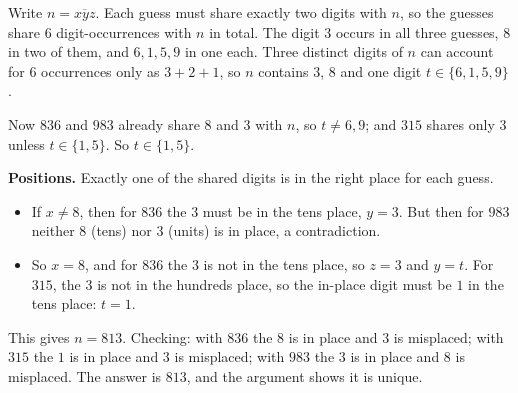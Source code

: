 Write $n=\overline{xyz}$. Each guess must share exactly two digits with $n$, so the guesses share $6$ digit-occurrences with $n$ in total. The digit $3$ occurs in all three guesses, $8$ in two of them, and $6,1,5,9$ in one each. Three distinct digits of $n$ can account for $6$ occurrences only as $3+2+1$, so $n$ contains $3$, $8$ and one digit $t\in\{6,1,5,9\}$.

Now $836$ and $983$ already share $8$ and $3$ with $n$, so $t\ne6,9$; and $315$ shares only $3$ unless $t\in\{1,5\}$. So $t\in\{1,5\}$.

\textbf{Positions.} Exactly one of the shared digits is in the right place for each guess.
\begin{itemize}
\item If $x\ne8$, then for $836$ the $3$ must be in the tens place, $y=3$. But then for $983$ neither $8$ (tens) nor $3$ (units) is in place, a contradiction.
\item So $x=8$, and for $836$ the $3$ is not in the tens place, so $z=3$ and $y=t$. For $315$, the $3$ is not in the hundreds place, so the in-place digit must be $1$ in the tens place: $t=1$.
\end{itemize}
This gives $n=813$. Checking: with $836$ the $8$ is in place and $3$ is misplaced; with $315$ the $1$ is in place and $3$ is misplaced; with $983$ the $3$ is in place and $8$ is misplaced. The answer is $\boxed{813}$, and the argument shows it is unique.
